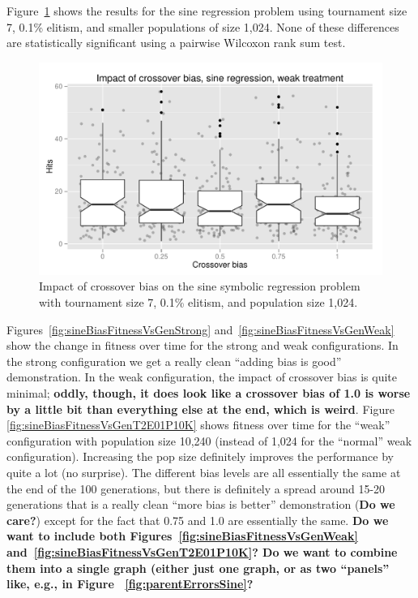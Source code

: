 \documentclass{sig-alternate}
\begin{document}
%
%
%
%

Figure~\ref{fig:sineBiasResultsWeak} shows the results for the sine regression problem using tournament size 7, 0.1\% 
elitism, and smaller populations  of size 1,024. None of these differences are statistically significant using a 
pairwise Wilcoxon rank sum test.

\begin{figure}
\centering
\includegraphics[width=0.45 \textwidth]{Plots/Sine_XO_impact_weak_boxplot.pdf}
\caption{Impact of crossover bias on the sine symbolic regression problem with tournament size 7, 0.1\% elitism, and 
population size 1,024.}
\label{fig:sineBiasResultsWeak}
\end{figure}

Figures~\ref{fig:sineBiasFitnessVsGenStrong} and~\ref{fig:sineBiasFitnessVsGenWeak} show the change in fitness 
over time for the strong and weak configurations. In the strong configuration we get a really clean ``adding bias is 
good'' demonstration. In the weak configuration, the impact of crossover bias is quite minimal; \textbf{oddly, though, it 
does look like a crossover bias of 1.0 is worse by a little bit than everything else at the end, which is weird}. Figure~
\ref{fig:sineBiasFitnessVsGenT2E01P10K} shows fitness over time for the ``weak'' configuration with population size 
10,240 (instead of 1,024 for the ``normal'' weak configuration). Increasing the pop size definitely improves the 
performance by quite a lot (no surprise). The different bias levels are all essentially the same at the end of the 100 
generations, but there is definitely a spread around 15-20 generations that is a really clean ``more bias is better'' 
demonstration (\textbf{Do we care?}) except for the fact that 0.75 and 1.0 are essentially the same. \textbf{Do we 
want to include both Figures~\ref{fig:sineBiasFitnessVsGenWeak} and~\ref{fig:sineBiasFitnessVsGenT2E01P10K}? 
Do we want to combine them into a single graph (either just one graph, or as two ``panels'' like, e.g., in Figure~
\ref{fig:parentErrorsSine}?}
\end{document}
